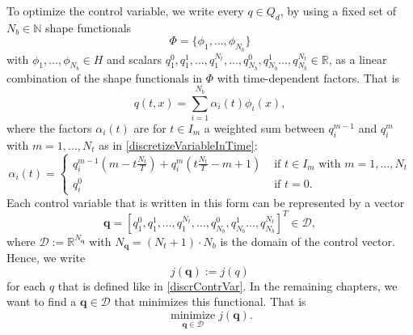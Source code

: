 To optimize the control variable, we write every $q\in Q_d$, by using a fixed set of $N_b\in\mathbb{N}$ shape functionals
\begin{equation}
\label{basisFuncionsList}
\Phi=\{\phi_1,\dotsc,\phi_{N_b}\}
\end{equation}
 with $\phi_1,\dotsc,\phi_{N_b}\in H$ and scalars $q_1^0,q_1^1,\dotsc,q_1^{N_t},\dotsc,q_{N_b}^0,q_{N_b}^1\dotsc,q_{N_b}^{N_t}\in\mathbb{R}$, as a linear combination of the shape functionals in $\Phi$ with time-dependent factors. That is
\begin{equation}
\label{discrContrVar}
q(t,x) = \sum_{i=1}^{N_b}\alpha_i(t)\phi_i(x),
\end{equation} 
where the factors $\alpha_i(t)$ are for $t\in I_m$ a weighted sum between $q^{m-1}_i$ and $q^m_i$ with $m=1,\dotsc,N_t$ as in \eqref{discretizeVariableInTime}:
\begin{displaymath}
\alpha_i(t)=\begin{cases}
q_i^{m-1}\left(m-t\frac{N_t}{T}\right) + q_i^m\left(t\frac{N_t}{T}-m+1\right) & \text{ if $t\in I_m$ with $m=1,\dotsc,N_t$}\\
q_i^0 & \text{ if $t=0$.}
\end{cases}
\end{displaymath}
Each control variable that is written in this form can be represented by a vector
\begin{displaymath}
\mathbf{q}=\left[q_1^0,q_1^1,\dotsc,q_1^{N_t},\dotsc,q_{N_b}^0,q_{N_b}^1\dotsc,q_{N_b}^{N_t}\right]^T\in\mathcal{D},
\end{displaymath} 
where $\mathcal{D}:=\mathbb{R}^{N_\mathbf{q}}$ with $N_\mathbf{q} = (N_t+1)\cdot N_b$ is the domain of the control vector. Hence, we write
\begin{equation}
\label{FOMFunctionalEvaluationDef}
j(\mathbf{q}):=j(q)
\end{equation}
for each $q$ that is defined like in \eqref{discrContrVar}. In the remaining chapters, we want to find a $\mathbf{q}\in\mathcal{D}$ that minimizes this functional. That is
\begin{equation}
\label{FOMOptimizationProblemDef}
\operatorname*{minimize}_{\mathbf{q}\in\mathcal{D}}j(\mathbf{q}).
\end{equation}

